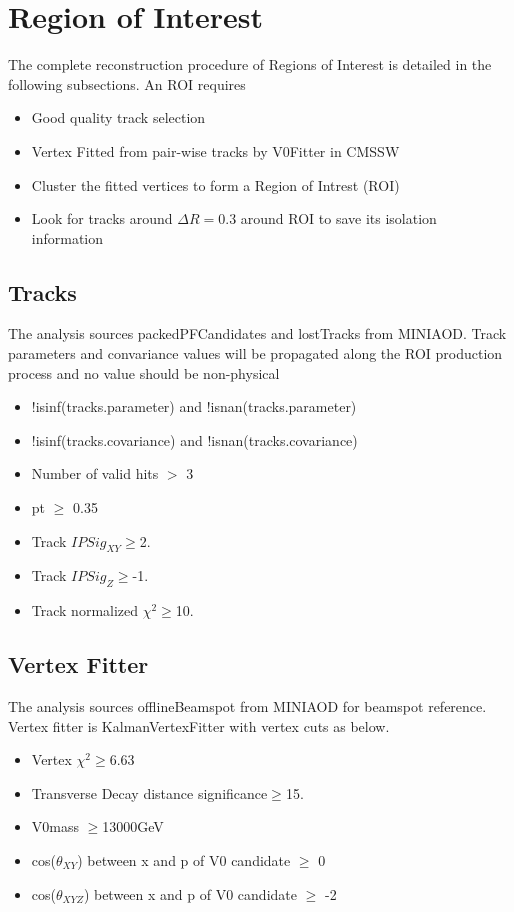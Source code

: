 \section{Region of Interest}\label{sec:ROIs}

The complete reconstruction procedure of Regions of Interest is detailed in the following subsections.
An ROI requires
\begin{itemize}
  \item Good quality track selection
  \item Vertex Fitted from pair-wise tracks by V0Fitter in CMSSW
  \item Cluster the fitted vertices to form a Region of Intrest (ROI)
  \item Look for tracks around $\Delta R=0.3$ around ROI to save its isolation information
\end{itemize}

\subsection{Tracks}\label{sec:ROI_tracks}

The analysis sources packedPFCandidates and lostTracks from MINIAOD.
Track parameters and convariance values will be propagated along the ROI production process and no value should be non-physical
\begin{itemize}
  \item !isinf(tracks.parameter)  and !isnan(tracks.parameter) 
  \item !isinf(tracks.covariance) and !isnan(tracks.covariance) 
  \item Number of valid hits $>$ 3
  \item pt $\geq$ 0.35
  \item Track $IPSig_{XY}\geq$2.
  \item Track $IPSig_{Z}\geq$-1.
  \item Track normalized $\chi^{2}\geq$10.
\end{itemize}


\subsection{Vertex Fitter}\label{sec:ROI_V0Fitter}

The analysis sources offlineBeamspot from MINIAOD for beamspot reference.
Vertex fitter is KalmanVertexFitter with vertex cuts as below.
\begin{itemize}
  \item Vertex $\chi^{2}\geq$6.63 
  \item Transverse Decay distance significance$\geq$15.
  \item V0mass $\geq$13000GeV
  \item cos($\theta_{XY}$) between x and p of V0 candidate $\geq$ 0
  \item cos($\theta_{XYZ}$) between x and p of V0 candidate $\geq$ -2
\end{itemize}


